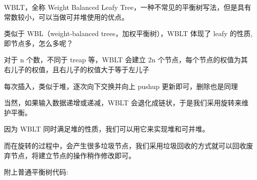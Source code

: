 
WBLT，全称 Weight Balanced Leafy Tree，一种不常见的平衡树写法，但是具有常数较小，可以当做可并堆使用的优点。

类似于 WBL（weight-balanced trees，加权平衡树），WBLT 体现了 leafy 的性质, 即节点多，怎么多呢？

对于 n 个数，不同于 treap 等，WBLT 会建立 2n 个节点，每个节点的权值为其右儿子的权值，且右儿子的权值大于等于左儿子

每次插入，类似于堆，逐次向下交换并向上 pushup 更新即可，删除也是同理

当然，如果输入数据递增或递减，WBLT 会退化成链状，于是我们采用旋转来维护平衡。

因为 WBLT 同时满足堆的性质，我们可以用它来实现堆和可并堆。

而在旋转的过程中，会产生很多垃圾节点，我们采用垃圾回收的方式就可以回收废弃节点，将建立节点的操作稍作修改即可。

附上普通平衡树代码:

